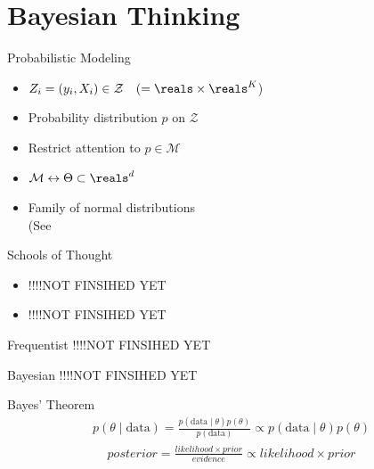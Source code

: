 \section{Bayesian Thinking}

\begin{frame}{Probabilistic Modeling}
  \Large{
  \begin{itemize}
    \item[]  $Z_i = (y_i, X_i) \in \mathcal{Z} \quad (=\reals \times \reals^K$)\pause
    \item[]  Probability distribution $p$ on $\mathcal{Z}$\pause
    \item[]  Restrict attention to $p \in \mathcal{M}$\pause
    \item[]  $\mathcal{M} \leftrightarrow \Theta \subset \reals^d$\pause
    \item[]  Family of normal distributions\pause\\
    \quad\quad\quad\quad (See \pause {}
  \end{itemize}
  }
\end{frame}

\begin{frame}{Schools of Thought}
  \Large{
  \begin{itemize}
    \item[]  !!!!NOT FINSIHED YET
    \item[] !!!!NOT FINSIHED YET
  \end{itemize}
  }
\end{frame}

\begin{frame}{Frequentist}
  !!!!NOT FINSIHED YET
\end{frame}

\begin{frame}{Bayesian}
  !!!!NOT FINSIHED YET
\end{frame}

\begin{frame}{Bayes' Theorem}
  \Large{
    \begin{align*}
      p(\theta \mid \text{data}) = \frac{p(\text{data} \mid \theta) p(\theta)}{p(\text{data})} \propto p(\text{data} \mid \theta) p(\theta)
    \end{align*}\pause
    \vfill
    \begin{align*}
      posterior = \frac{likelihood \times prior}{evidence} \propto likelihood \times prior
    \end{align*}
  }
\end{frame}

